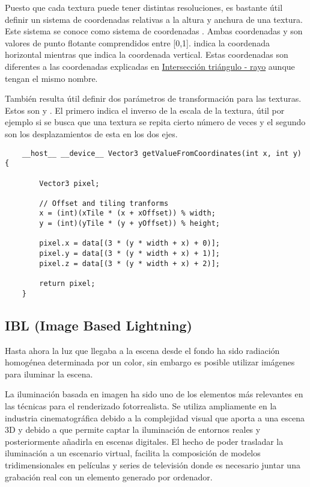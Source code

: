 Puesto que cada textura puede tener distintas resoluciones, es bastante útil definir un sistema de coordenadas relativas a la altura y anchura de una textura. Este sistema se conoce como sistema de coordenadas . Ambas coordenadas  y  son valores de punto flotante comprendidos entre [0,1].  indica la coordenada horizontal mientras que  indica la coordenada vertical. Estas coordenadas son diferentes a las coordenadas  explicadas en \hyperref[subsec:triintersection]{Intersección triángulo - rayo} aunque tengan el mismo nombre.

También resulta útil definir dos parámetros de transformación para las texturas. Estos son  y . El primero indica el inverso de la escala de la textura, útil por ejemplo si se busca que una textura se repita cierto número de veces y el segundo son los desplazamientos de esta en los dos ejes.

\begin{lstlisting}
	__host__ __device__ Vector3 getValueFromCoordinates(int x, int y) {
	
        Vector3 pixel;

        // Offset and tiling tranforms
        x = (int)(xTile * (x + xOffset)) % width;
        y = (int)(yTile * (y + yOffset)) % height;

        pixel.x = data[(3 * (y * width + x) + 0)];
        pixel.y = data[(3 * (y * width + x) + 1)];
        pixel.z = data[(3 * (y * width + x) + 2)];

        return pixel;
    }
	\end{lstlisting}

\subsection{IBL (Image Based Lightning)}
	
Hasta ahora la luz que llegaba a la escena desde el fondo ha sido radiación homogénea determinada por un color, sin embargo es posible utilizar imágenes para iluminar la escena.
	
La iluminación basada en imagen ha sido uno de los elementos más relevantes en las técnicas para el renderizado fotorrealista. Se utiliza ampliamente en la industria cinematográfica debido a la complejidad visual que aporta a una escena 3D y debido a que permite captar la iluminación de entornos reales y posteriormente añadirla en escenas digitales. El hecho de poder trasladar la iluminación a un escenario virtual, facilita la composición de modelos tridimensionales en películas y series de televisión donde es necesario juntar una grabación real con un elemento generado por ordenador.

